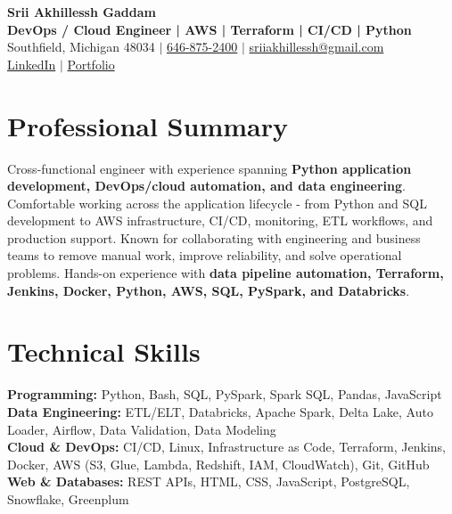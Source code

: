 \documentclass[letterpaper,10pt]{article}
\begin{document}
\fontsize{9.35pt}{10.45pt}\selectfont

\begin{center}
    {\LARGE \textbf{Srii Akhillessh Gaddam}} \\[-1pt]
    \textbf{DevOps / Cloud Engineer | AWS | Terraform | CI/CD | Python} \\[2pt]
    Southfield, Michigan 48034 $|$
    \href{tel:6468752400}{646-875-2400} $|$
    \href{mailto:sriiakhillessh@gmail.com}{sriiakhillessh@gmail.com} \\[1pt]
    \href{https://www.linkedin.com/in/srii-akhiilessh-gaddam-b48668191/}{LinkedIn} $|$
    \href{https://sriiakhillesshg.github.io/portfolio/}{Portfolio}
\end{center}
\vspace{-8pt}

\section{Professional Summary}
\small{Cross-functional engineer with experience spanning \textbf{Python application development, DevOps/cloud automation, and data engineering}. Comfortable working across the application lifecycle - from Python and SQL development to AWS infrastructure, CI/CD, monitoring, ETL workflows, and production support. Known for collaborating with engineering and business teams to remove manual work, improve reliability, and solve operational problems. Hands-on experience with \textbf{data pipeline automation, Terraform, Jenkins, Docker, Python, AWS, SQL, PySpark, and Databricks}.}

\section{Technical Skills}
\small{
\textbf{Programming:} Python, Bash, SQL, PySpark, Spark SQL, Pandas, JavaScript \\
\textbf{Data Engineering:} ETL/ELT, Databricks, Apache Spark, Delta Lake, Auto Loader, Airflow, Data Validation, Data Modeling \\
\textbf{Cloud \& DevOps:} CI/CD, Linux, Infrastructure as Code, Terraform, Jenkins, Docker, AWS (S3, Glue, Lambda, Redshift, IAM, CloudWatch), Git, GitHub \\
\textbf{Web \& Databases:} REST APIs, HTML, CSS, JavaScript, PostgreSQL, Snowflake, Greenplum
}
\end{document}
